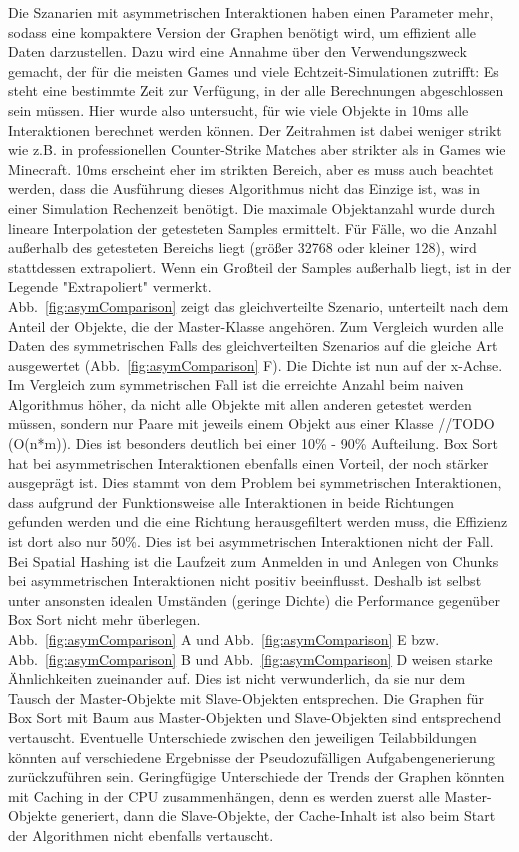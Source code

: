 Die Szanarien mit asymmetrischen Interaktionen haben einen Parameter mehr, sodass eine kompaktere Version der Graphen benötigt wird, um effizient alle Daten darzustellen. Dazu wird eine Annahme über den Verwendungszweck gemacht, der für die meisten Games und viele Echtzeit-Simulationen zutrifft: Es steht eine bestimmte Zeit zur Verfügung, in der alle Berechnungen abgeschlossen sein müssen. Hier wurde also untersucht, für wie viele Objekte in 10ms alle Interaktionen berechnet werden können. Der Zeitrahmen ist dabei weniger strikt wie z.B. in professionellen Counter-Strike Matches aber strikter als in Games wie Minecraft. 10ms erscheint eher im strikten Bereich, aber es muss auch beachtet werden, dass die Ausführung dieses Algorithmus nicht das Einzige ist, was in einer Simulation Rechenzeit benötigt. Die maximale Objektanzahl wurde durch lineare Interpolation der getesteten Samples ermittelt. Für Fälle, wo die Anzahl außerhalb des getesteten Bereichs liegt (größer 32768 oder kleiner 128), wird stattdessen extrapoliert. Wenn ein Großteil der Samples außerhalb liegt, ist in der Legende "Extrapoliert" vermerkt.\\
Abb.~\ref{fig:asymComparison} zeigt das gleichverteilte Szenario, unterteilt nach dem Anteil der Objekte, die der Master-Klasse angehören. Zum Vergleich wurden alle Daten des symmetrischen Falls des gleichverteilten Szenarios auf die gleiche Art ausgewertet (Abb.~\ref{fig:asymComparison} F). Die Dichte ist nun auf der x-Achse. Im Vergleich zum symmetrischen Fall ist die erreichte Anzahl beim naiven Algorithmus höher, da nicht alle Objekte mit allen anderen getestet werden müssen, sondern nur Paare mit jeweils einem Objekt aus einer Klasse //TODO (O(n*m)). Dies ist besonders deutlich bei einer 10\% - 90\% Aufteilung. Box Sort hat bei asymmetrischen Interaktionen ebenfalls einen Vorteil, der noch stärker ausgeprägt ist. Dies stammt von dem Problem bei symmetrischen Interaktionen, dass aufgrund der Funktionsweise alle Interaktionen in beide Richtungen gefunden werden und die eine Richtung herausgefiltert werden muss, die Effizienz ist dort also nur 50\%. Dies ist bei asymmetrischen Interaktionen nicht der Fall. Bei Spatial Hashing ist die Laufzeit zum Anmelden in und Anlegen von Chunks bei asymmetrischen Interaktionen nicht positiv beeinflusst. Deshalb ist selbst unter ansonsten idealen Umständen (geringe Dichte) die Performance gegenüber Box Sort nicht mehr überlegen.\\
Abb.~\ref{fig:asymComparison} A und Abb.~\ref{fig:asymComparison} E bzw. Abb.~\ref{fig:asymComparison} B und Abb.~\ref{fig:asymComparison} D weisen starke Ähnlichkeiten zueinander auf. Dies ist nicht verwunderlich, da sie nur dem Tausch der Master-Objekte mit Slave-Objekten entsprechen. Die Graphen für Box Sort mit Baum aus Master-Objekten und Slave-Objekten sind entsprechend vertauscht. Eventuelle Unterschiede zwischen den jeweiligen Teilabbildungen könnten auf verschiedene Ergebnisse der Pseudozufälligen Aufgabengenerierung zurückzuführen sein. Geringfügige Unterschiede der Trends der Graphen könnten mit Caching in der CPU zusammenhängen, denn es werden zuerst alle Master-Objekte generiert, dann die Slave-Objekte, der Cache-Inhalt ist also beim Start der Algorithmen nicht ebenfalls vertauscht.\\
